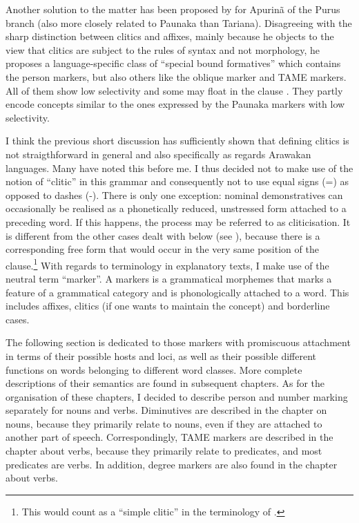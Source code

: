 Another solution to the matter has been proposed by \citet[]{Facundes2000} for Apurinã of the Purus branch (also more closely related to Paunaka than Tariana). Disagreeing with the sharp distinction between clitics and affixes, mainly because he objects to the view that clitics are subject to the rules of syntax and not morphology, he proposes a language-specific class of “special bound formatives” which contains the person markers, but also others like the oblique marker and TAME markers. All of them show low selectivity and some may float in the clause \citep[431]{Facundes2000}. They partly encode concepts similar to the ones expressed by the Paunaka markers with low selectivity. 

I think the previous short discussion has sufficiently shown that defining clitics is not straigthforward in general and also specifically as regards Arawakan languages. Many have noted this before me. I thus decided not to make use of the notion of “clitic” in this grammar and consequently not to use equal signs (=) as opposed to dashes (-). There is only one exception: nominal demonstratives can occasionally be realised as a phonetically reduced, unstressed form attached to a preceding word. If this happens, the process may be referred to as cliticisation. It is different from the other cases dealt with below (see ), because there is a corresponding free form that would occur in the very same position of the clause.\footnote{This would count as a “simple clitic” in the terminology of \citet[]{Zwicky1977}.} With regards to terminology in explanatory texts, I make use of the neutral term “marker”. A markers is a grammatical morphemes that marks a feature of a  grammatical category and is phonologically attached to a word. This includes affixes, clitics (if one wants to maintain the concept) and borderline cases. 

The following section is dedicated to those markers with promiscuous attachment in terms of their possible hosts and loci, as well as their possible different functions on words belonging to different word classes. More complete descriptions of their semantics are found in subsequent chapters. As for the organisation of these chapters, I decided to describe person and number marking separately for nouns and verbs. Diminutives are described in the chapter on nouns, because they primarily relate to nouns, even if they are attached to another part of speech. Correspondingly, TAME markers are described in the chapter about verbs, because they primarily relate to predicates, and most predicates are verbs. In addition, degree markers are also found in the chapter about verbs.

